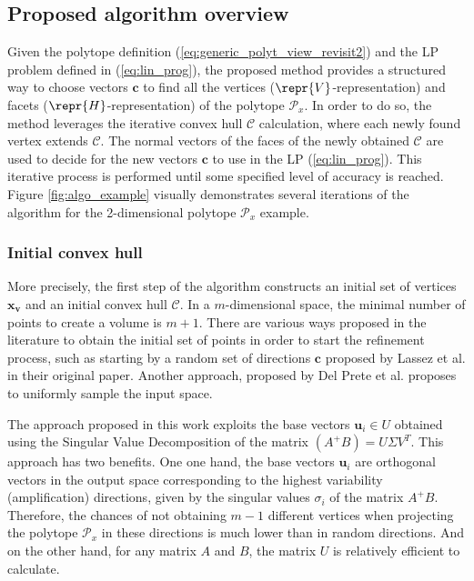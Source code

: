 \subsection{Proposed algorithm overview}
\label{ch:method}

Given the polytope definition (\ref{eq:generic_polyt_view_revisit2}) and the LP problem defined in (\ref{eq:lin_prog}), the proposed method provides a structured way to choose vectors $\bm{c}$ to find all the vertices ($\repr{V}$-representation) and facets ($\repr{H}$-representation) of the polytope $\mathcal{P}_x$. 
In order to do so, the method leverages the iterative convex hull $\mathcal{C}$ calculation, where each newly found vertex extends $\mathcal{C}$. The normal vectors of the faces of the newly obtained $\mathcal{C}$ are used to decide for the new vectors $\bm{c}$ to use in the LP (\ref{eq:lin_prog}). This iterative process is performed until some specified level of accuracy is reached. Figure \ref{fig:algo_example} visually demonstrates several iterations of the algorithm for the 2-dimensional polytope $\mathcal{P}_x$ example.

\subsubsection{Initial convex hull}More precisely, the first step of the algorithm constructs an initial set of vertices $\bm{x_v}$ and an initial convex hull $\mathcal{C}$. In a $m$-dimensional space, the minimal number of points to create a volume is $m\!+\!1$.  There are various ways proposed in the literature to obtain the initial set of points in order to start the refinement process, such as starting by a random set of directions $\bm{c}$ proposed by Lassez et al. \cite{lassez1992quantifier} in their original paper. Another approach, proposed by Del Prete et al. \cite{DelPrete2016Fast} proposes to uniformly sample the input space.

The approach proposed in this work exploits the base vectors $\bm{u}_i\in U$ obtained using the Singular Value Decomposition of the matrix $(A^+B) = U\Sigma V^T$. This approach has two benefits. One one hand, the base vectors $\bm{u}_i$ are orthogonal vectors in the output space corresponding to the 
highest variability (amplification) directions, given by the singular values $\sigma_i$ of the matrix $A^+B$.
Therefore, the chances of not obtaining $m-1$ different vertices when projecting the polytope $\mathcal{P}_x$ in these directions is much lower than in random directions. And on the other hand, for any matrix $A$ and $B$, the matrix $U$ is relatively efficient to calculate.

